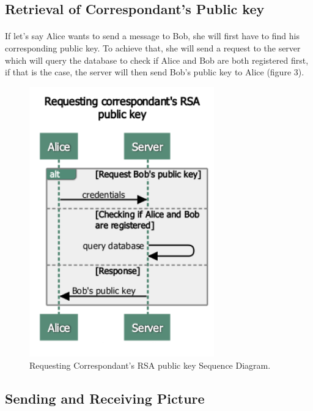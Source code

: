	  \subsection{Retrieval of Correspondant's Public key}
	  \paragraph{}
	  
	    If let's say Alice wants to send a message to Bob, she will first have to find his corresponding public key. To achieve that, she will send a request to the server which will query the database to check if Alice and Bob are both registered first, if that is the case, the server will then send Bob's public key to Alice (figure 3).
	    
	    \begin{figure}[H]
	      \centering
	      \includegraphics[width=8cm]{images/architecture/requestingcorrespondant'sRSApublickey}
	      \caption{Requesting Correspondant's RSA public key Sequence Diagram.}
	    \end{figure}
	    
	    
	    \subsection{Sending and Receiving Picture}
	    \paragraph{}
	    
